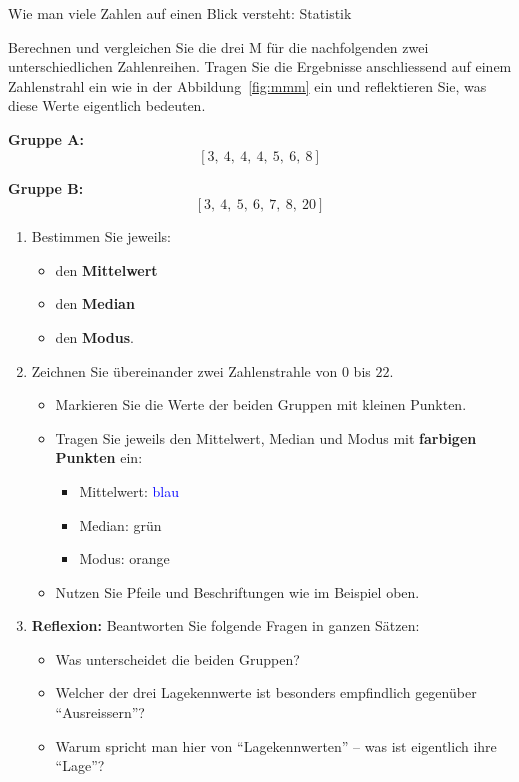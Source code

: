 \begin{lpu}{Wie man viele Zahlen auf einen Blick versteht: Statistik}
\begin{aufgabe}{1}
Berechnen und vergleichen Sie die drei M für die nachfolgenden zwei unterschiedlichen Zahlenreihen. Tragen Sie die Ergebnisse anschliessend auf einem Zahlenstrahl ein wie in der Abbildung~\ref{fig:mmm} ein und reflektieren Sie, was diese Werte eigentlich bedeuten.

\vspace{1em}
\textbf{Gruppe A:}
\[
[3,\ 4,\ 4,\ 4,\ 5,\ 6,\ 8]
\]

\textbf{Gruppe B:}
\[
[3,\ 4,\ 5,\ 6,\ 7,\ 8,\ 20]
\]

\begin{enumerate}
  \item Bestimmen Sie jeweils:
    \begin{itemize}
      \item den \textbf{Mittelwert}
      \item den \textbf{Median}
      \item den \textbf{Modus}.
    \end{itemize}

  \item Zeichnen Sie übereinander zwei Zahlenstrahle von $0$ bis $22$.
    \begin{itemize}
      \item Markieren Sie die Werte der beiden Gruppen mit kleinen Punkten.
      \item Tragen Sie jeweils den Mittelwert, Median und Modus mit \textbf{farbigen Punkten} ein:
        \begin{itemize}
          \item Mittelwert: \textcolor{blue}{blau}
          \item Median: \textcolor{green!70!black}{grün}
          \item Modus: \textcolor{orange!90!black}{orange}
        \end{itemize}
        \item Nutzen Sie Pfeile und Beschriftungen wie im Beispiel oben.
    \end{itemize}
      \item \textbf{Reflexion:} Beantworten Sie folgende Fragen in ganzen Sätzen:
    \begin{itemize}
      \item Was unterscheidet die beiden Gruppen?
      \item Welcher der drei Lagekennwerte ist besonders empfindlich gegenüber ``Ausreissern''?
      \item Warum spricht man hier von ``Lagekennwerten'' – was ist eigentlich ihre ``Lage''?
    \end{itemize}
\end{enumerate}


\end{aufgabe}
\end{lpu}
